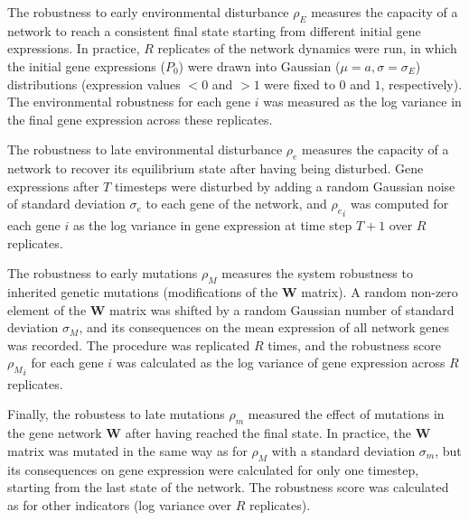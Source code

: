 \documentclass[10pt,a4paper]{article}
\newcommand{\earlyenv}{{\rho_E}}
\newcommand{\lateenv}{{\rho_e}}
\newcommand{\earlymut}{{\rho_M}}
\newcommand{\latemut}{{\rho_m}}
\begin{document}
The robustness to early environmental disturbance $\earlyenv$ measures the capacity of a network to reach a consistent final state starting from different initial gene expressions. In practice, $R$ replicates of the network dynamics were run, in which the initial gene expressions ($P_0$) were drawn into Gaussian ($\mu = a, \sigma = \sigma_E$) distributions (expression values $<0$ and $>1$ were fixed to $0$ and $1$, respectively). The environmental robustness for each gene $i$ was measured as the log variance in the final gene expression across these replicates. 

The robustness to late environmental disturbance $\lateenv$ measures the capacity of a network to recover its equilibrium state after having being disturbed. Gene expressions after $T$ timesteps were disturbed by adding a random Gaussian noise of standard deviation $\sigma_e$ to each gene of the network, and $\lateenv_i$ was computed for each gene $i$ as the log variance in gene expression at time step $T+1$ over $R$ replicates. 

The robustness to early mutations $\earlymut$ measures the system robustness to inherited genetic mutations (modifications of the $\bm W$ matrix). A random non-zero element of the $\bm W$ matrix was shifted by a random Gaussian number of standard deviation $\sigma_M$, and its consequences on the mean expression of all network genes was recorded. The procedure was replicated $R$ times, and the robustness score $\earlymut_i$ for each gene $i$ was calculated as the log variance of gene expression across $R$ replicates. 

Finally, the robustess to late mutations $\latemut$ measured the effect of mutations in the gene network $\bm W$ after having reached the final state. In practice, the $\bm W$ matrix was mutated in the same way as for $\earlymut$ with a standard deviation $\sigma_m$, but its consequences on gene expression were calculated for only one timestep, starting from the last state of the network. The robustness score was calculated as for other indicators (log variance over $R$ replicates).
\end{document}
